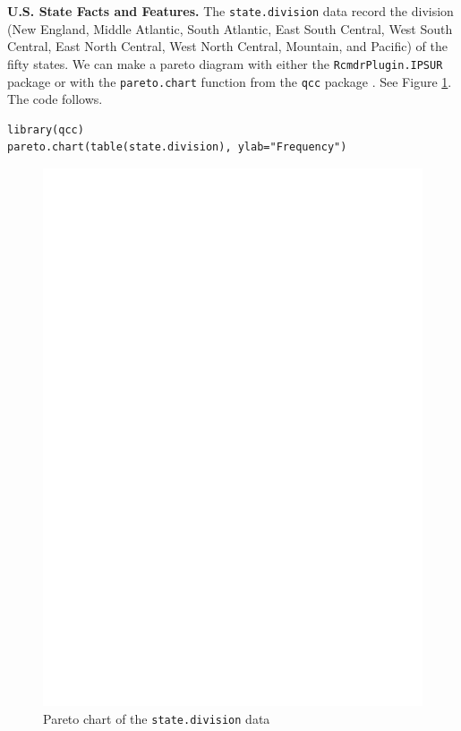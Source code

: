 \documentclass[captions=tableheading]{scrbook}
\begin{document}
\begin{example}
\textbf{U.S. State Facts and Features.} The \texttt{state.division} data record the division (New England, Middle Atlantic, South Atlantic, East South Central, West South Central, East North Central, West North Central, Mountain, and Pacific) of the fifty states. We can make a pareto diagram with either the \texttt{RcmdrPlugin.IPSUR} package or with the \texttt{pareto.chart} function from the \texttt{qcc} package \cite{qcc}. See Figure \ref{fig:Pareto-chart}. The code follows.


\begin{verbatim}
library(qcc)
pareto.chart(table(state.division), ylab="Frequency")
\end{verbatim}





\begin{figure}[th]
  \includegraphics[angle=270, totalheight=4in]{ps/Pareto-chart.ps}
  \caption{Pareto chart of the \texttt{state.division} data}
  \label{fig:Pareto-chart}
\end{figure}


\end{example}
\end{document}
